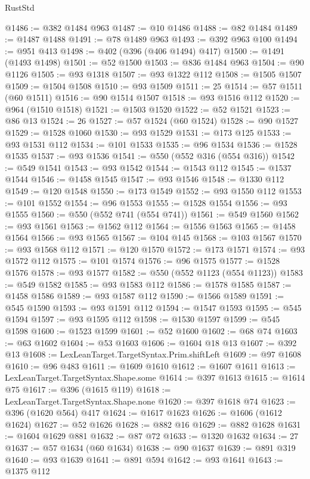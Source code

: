 \begin{lexlean}{RustStd}
\begin{coremodule}
@1486 := @382 @1484 @963
@1487 := @10 @1486
@1488 := @82 @1484
@1489 := @1487 @1488
@1491 := @78 @1489 @963
@1493 := @392 @963 @100
@1494 := @951 @413
@1498 := @402 (@396 (@406 @1494) @417)
@1500 := @1491 (@1493 @1498)
@1501 := @52 @1500
@1503 := @836 @1484 @963
@1504 := @90 @1126
@1505 := @93 @1318
@1507 := @93 @1322 @112
@1508 := @1505 @1507
@1509 := @1504 @1508
@1510 := @93 @1509
@1511 := 25
@1514 := @57 @1511 (@60 @1511)
@1516 := @90 @1514 @1507
@1518 := @93 @1516 @112
@1520 := @964 (@1510 @1518)
@1521 := @1503 @1520
@1522 := @52 @1521
@1523 := @86 @13
@1524 := 26
@1527 := @57 @1524 (@60 @1524)
@1528 := @90 @1527
@1529 := @1528 @1060
@1530 := @93 @1529
@1531 := @173 @125
@1533 := @93 @1531 @112
@1534 := @101 @1533
@1535 := @96 @1534
@1536 := @1528 @1535
@1537 := @93 @1536
@1541 := @550 (@552 @316 (@554 @316))
@1542 := @549 @1541
@1543 := @93 @1542
@1544 := @1543 @112
@1545 := @1537 @1544
@1546 := @1458 @1545
@1547 := @93 @1546
@1548 := @1330 @112
@1549 := @120 @1548
@1550 := @173 @1549
@1552 := @93 @1550 @112
@1553 := @101 @1552
@1554 := @96 @1553
@1555 := @1528 @1554
@1556 := @93 @1555
@1560 := @550 (@552 @741 (@554 @741))
@1561 := @549 @1560
@1562 := @93 @1561
@1563 := @1562 @112
@1564 := @1556 @1563
@1565 := @1458 @1564
@1566 := @93 @1565
@1567 := @104 @145
@1568 := @103 @1567
@1570 := @93 @1568 @112
@1571 := @120 @1570
@1572 := @173 @1571
@1574 := @93 @1572 @112
@1575 := @101 @1574
@1576 := @96 @1575
@1577 := @1528 @1576
@1578 := @93 @1577
@1582 := @550 (@552 @1123 (@554 @1123))
@1583 := @549 @1582
@1585 := @93 @1583 @112
@1586 := @1578 @1585
@1587 := @1458 @1586
@1589 := @93 @1587 @112
@1590 := @1566 @1589
@1591 := @545 @1590
@1593 := @93 @1591 @112
@1594 := @1547 @1593
@1595 := @545 @1594
@1597 := @93 @1595 @112
@1598 := @1530 @1597
@1599 := @545 @1598
@1600 := @1523 @1599
@1601 := @52 @1600
@1602 := @68 @74
@1603 := @63 @1602
@1604 := @53 @1603
@1606 := @1604 @18 @13
@1607 := @392 @13
@1608 := LexLeanTarget.TargetSyntax.Prim.shiftLeft
@1609 := @97 @1608
@1610 := @96 @483
@1611 := @1609 @1610
@1612 := @1607 @1611
@1613 := LexLeanTarget.TargetSyntax.Shape.some
@1614 := @397 @1613
@1615 := @1614 @75
@1617 := @396 (@1615 @119)
@1618 := LexLeanTarget.TargetSyntax.Shape.none
@1620 := @397 @1618 @74
@1623 := @396 (@1620 @564) @417
@1624 := @1617 @1623
@1626 := @1606 (@1612 @1624)
@1627 := @52 @1626
@1628 := @882 @16
@1629 := @882 @1628
@1631 := @1604 @1629 @881
@1632 := @87 @72
@1633 := @1320 @1632
@1634 := 27
@1637 := @57 @1634 (@60 @1634)
@1638 := @90 @1637
@1639 := @891 @319
@1640 := @93 @1639
@1641 := @891 @594
@1642 := @93 @1641
@1643 := @1375 @112

\end{coremodule}
\end{lexlean}
